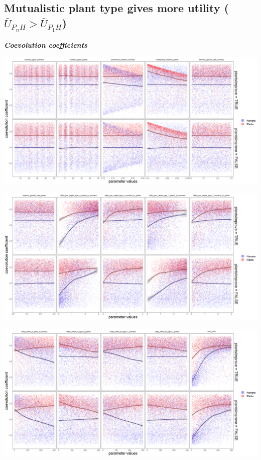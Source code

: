 \documentclass[
]{book}
\begin{document}
\newpage

\hypertarget{mutualistic-plant-type-gives-more-utility-baru_p_nh-baru_p_1h}{%
\subsection{\texorpdfstring{Mutualistic plant type gives more utility (\(\bar{U}_{P_{n}H}> \bar{U}_{P_{1}H}\))}{Mutualistic plant type gives more utility (\textbackslash bar\{U\}\_\{P\_\{n\}H\}\textgreater{} \textbackslash bar\{U\}\_\{P\_\{1\}H\})}}\label{mutualistic-plant-type-gives-more-utility-baru_p_nh-baru_p_1h}}


\textbf{\emph{Coevolution coefficients}}

\includegraphics[width=1\linewidth]{plots/5_LHS_plantsImprove_coevolution_coefficients_bifurcationPlot_twoVariables_per_parameter_and_scenario_part1}

\includegraphics[width=1\linewidth]{plots/5_LHS_plantsImprove_coevolution_coefficients_bifurcationPlot_twoVariables_per_parameter_and_scenario_part2}

\includegraphics[width=1\linewidth]{plots/5_LHS_plantsImprove_coevolution_coefficients_bifurcationPlot_twoVariables_per_parameter_and_scenario_part3}
\end{document}
